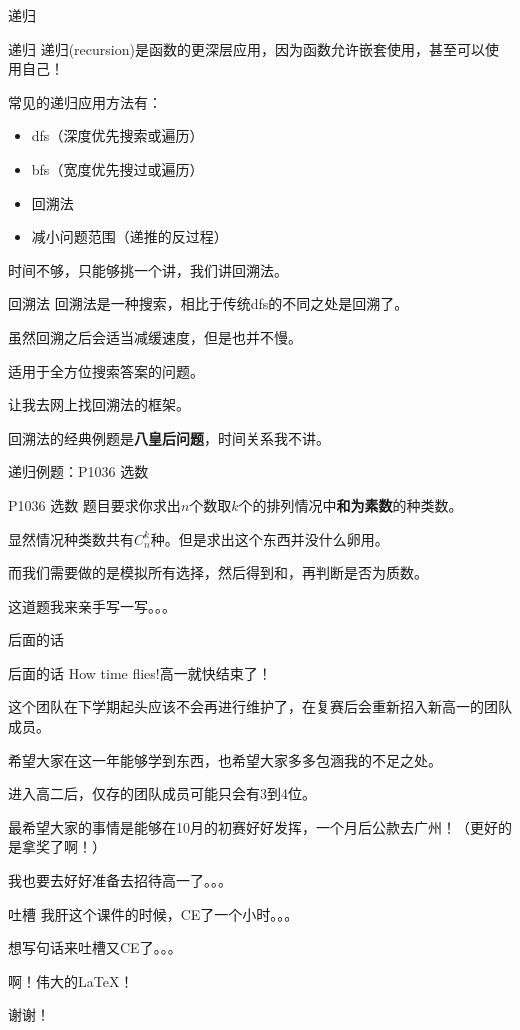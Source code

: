 \documentclass[UTF-8]{beamer}
\begin{document}
\begin{section}{递归}
\begin{frame}{递归}
\pause
递归(recursion)是函数的更深层应用，因为函数允许嵌套使用，甚至可以使用自己！\pause

常见的递归应用方法有：\pause
\begin{itemize}
  \item dfs（深度优先搜索或遍历）
  \item bfs（宽度优先搜过或遍历）
  \item 回溯法
  \item 减小问题范围（递推的反过程）
\end{itemize}
\pause
时间不够，只能够挑一个讲，我们讲回溯法。
\end{frame}
\begin{frame}{回溯法}
\pause
回溯法是一种搜索，相比于传统dfs的不同之处是回溯了。\pause

虽然回溯之后会适当减缓速度，但是也并不慢。\pause

适用于全方位搜索答案的问题。\pause

让我去网上找回溯法的框架。\pause

回溯法的经典例题是\textbf{八皇后问题}，时间关系我不讲。
\end{frame}
\end{section}

\begin{section}{递归例题：P1036 选数}
\begin{frame}{P1036 选数}
\pause
题目要求你求出$n$个数取$k$个的排列情况中\textbf{和为素数}的种类数。\pause

显然情况种类数共有$C_n^k$种。但是求出这个东西并没什么卵用。\pause

而我们需要做的是模拟所有选择，然后得到和，再判断是否为质数。\pause

这道题我来亲手写一写。。。
\end{frame}
\end{section}

\begin{section}{后面的话}
\begin{frame}{后面的话}
\pause
How time flies!高一就快结束了！\pause

这个团队在下学期起头应该不会再进行维护了，在复赛后会重新招入新高一的团队成员。\pause

希望大家在这一年能够学到东西，也希望大家多多包涵我的不足之处。\pause

进入高二后，仅存的团队成员可能只会有3到4位。\pause

最希望大家的事情是能够在10月的初赛好好发挥，一个月后公款去广州！（更好的是拿奖了啊！）\pause

我也要去好好准备去招待高一了。。。
\end{frame}
\begin{frame}{吐槽}
\pause
我肝这个课件的时候，CE了一个小时。。。\pause

想写句话来吐槽又CE了。。。\pause

啊！伟大的\LaTeX！
\end{frame}
\end{section}

\begin{frame}
\pause
\begin{center}
  \huge{谢谢！}
\end{center}
\end{frame}
\end{document}
